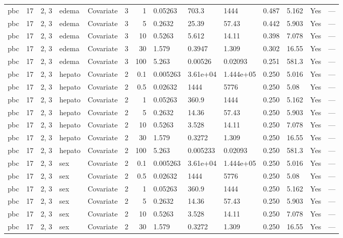 \begin{tabular}{lrlllrrlllllll}
  pbc & 17 & 2, 3 & edema & Covariate & 3 &     1 & 0.05263 & 703.3 & 1444 & 0.487 & 5.162 & Yes & --- \\ 
  pbc & 17 & 2, 3 & edema & Covariate & 3 &     5 & 0.2632 & 25.39 & 57.43 & 0.442 & 5.903 & Yes & --- \\ 
  pbc & 17 & 2, 3 & edema & Covariate & 3 &    10 & 0.5263 & 5.612 & 14.11 & 0.398 & 7.078 & Yes & --- \\ 
  pbc & 17 & 2, 3 & edema & Covariate & 3 &    30 & 1.579 & 0.3947 & 1.309 & 0.302 & 16.55 & Yes & --- \\ 
  pbc & 17 & 2, 3 & edema & Covariate & 3 &   100 & 5.263 & 0.00526 & 0.02093 & 0.251 & 581.3 & Yes & --- \\ 
  pbc & 17 & 2, 3 & hepato & Covariate & 2 &   0.1 & 0.005263 & 3.61e+04 & 1.444e+05 & 0.250 & 5.016 & Yes & --- \\ 
  pbc & 17 & 2, 3 & hepato & Covariate & 2 &   0.5 & 0.02632 & 1444 & 5776 & 0.250 & 5.08 & Yes & --- \\ 
  pbc & 17 & 2, 3 & hepato & Covariate & 2 &     1 & 0.05263 & 360.9 & 1444 & 0.250 & 5.162 & Yes & --- \\ 
  pbc & 17 & 2, 3 & hepato & Covariate & 2 &     5 & 0.2632 & 14.36 & 57.43 & 0.250 & 5.903 & Yes & --- \\ 
  pbc & 17 & 2, 3 & hepato & Covariate & 2 &    10 & 0.5263 & 3.528 & 14.11 & 0.250 & 7.078 & Yes & --- \\ 
  pbc & 17 & 2, 3 & hepato & Covariate & 2 &    30 & 1.579 & 0.3272 & 1.309 & 0.250 & 16.55 & Yes & --- \\ 
  pbc & 17 & 2, 3 & hepato & Covariate & 2 &   100 & 5.263 & 0.005233 & 0.02093 & 0.250 & 581.3 & Yes & --- \\ 
  pbc & 17 & 2, 3 & sex & Covariate & 2 &   0.1 & 0.005263 & 3.61e+04 & 1.444e+05 & 0.250 & 5.016 & Yes & --- \\ 
  pbc & 17 & 2, 3 & sex & Covariate & 2 &   0.5 & 0.02632 & 1444 & 5776 & 0.250 & 5.08 & Yes & --- \\ 
  pbc & 17 & 2, 3 & sex & Covariate & 2 &     1 & 0.05263 & 360.9 & 1444 & 0.250 & 5.162 & Yes & --- \\ 
  pbc & 17 & 2, 3 & sex & Covariate & 2 &     5 & 0.2632 & 14.36 & 57.43 & 0.250 & 5.903 & Yes & --- \\ 
  pbc & 17 & 2, 3 & sex & Covariate & 2 &    10 & 0.5263 & 3.528 & 14.11 & 0.250 & 7.078 & Yes & --- \\ 
  pbc & 17 & 2, 3 & sex & Covariate & 2 &    30 & 1.579 & 0.3272 & 1.309 & 0.250 & 16.55 & Yes & --- \\ 

\end{tabular}
